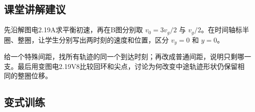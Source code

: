 \documentclass[UTF8,fontset=fandol,a4paper,11pt]{ctexart}
\begin{document}
\subsection*{课堂讲解建议}

先沿解图电2.19A求平衡初速，再在B图分别取 $v_0=3v_g/2$ 与 $v_g/2$。在时间轴标半圈、整圈，让学生分别写出两时刻的速度和位置，区分 $v_y=0$ 和 $y=0$。

给一个特殊间距，找所有轨迹的同一个到达时刻；再改成普通间距，说明只剩哪一支。最后用变图电2.19V8比较回环和尖点，讨论为何改变中途轨迹形状仍保留相同的整圈位移。


\subsection*{变式训练}
\end{document}
